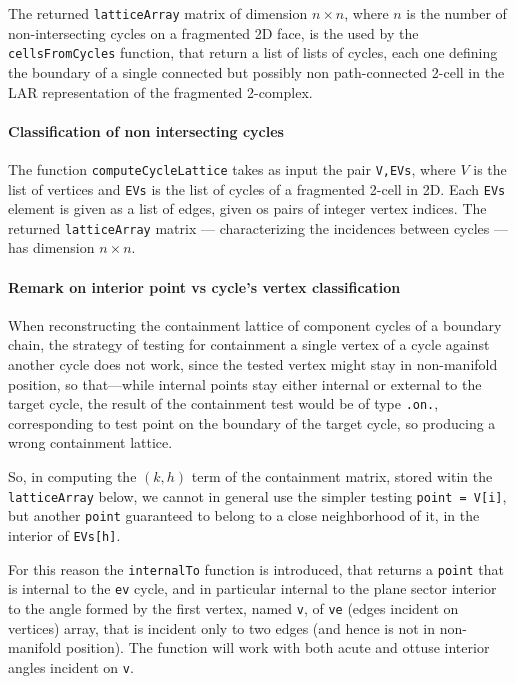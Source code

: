 \documentclass[11pt,oneside]{article}    %
\begin{document}
The returned \texttt{latticeArray} matrix of dimension $n\times n$, where $n$ is the number of non-intersecting cycles on a fragmented 2D face, is the used by the \texttt{cellsFromCycles} function, that return a list of lists of cycles, each one defining the boundary of a single connected but possibly non path-connected 2-cell in the LAR representation of the fragmented 2-complex. 

\paragraph{Classification of non intersecting cycles}

The function \texttt{computeCycleLattice} takes as input the pair \texttt{V,EVs}, where $V$ is the list of vertices and \texttt{EVs} is the list of cycles of a fragmented 2-cell in 2D. Each \texttt{EVs} element is given as a list of edges, given os pairs of integer vertex indices.
The returned \texttt{latticeArray} matrix --- characterizing the incidences between cycles --- has dimension $n\times n$.

\paragraph{Remark on interior point vs cycle's vertex classification }

When reconstructing the containment lattice of component cycles of a boundary chain, the strategy of testing for containment a single vertex of a cycle against another cycle does not work, since the tested vertex might stay in non-manifold position, so that---while internal points stay either internal or external to the target cycle, the result of the containment test would be of type \texttt{.on.}, corresponding to test point on the boundary of the target cycle, so producing a wrong containment lattice.

So, in computing the $(k,h)$ term of the containment matrix, stored witin the \texttt{latticeArray} below, we cannot in general use the simpler testing \texttt{point = V[i]}, but another \texttt{point} guaranteed to belong to a close neighborhood of it, in the interior of \texttt{EVs[h]}.

For this reason the \texttt{internalTo} function is introduced, that returns a \texttt{point} that is internal to the \texttt{ev} cycle, and in particular internal to the plane sector interior to the angle formed by the first vertex, named \texttt{v}, of \texttt{ve} (edges incident on vertices) array, that is incident only to two edges (and hence is not in non-manifold position). The function will work with both acute and ottuse interior angles incident on \texttt{v}.
\end{document}
